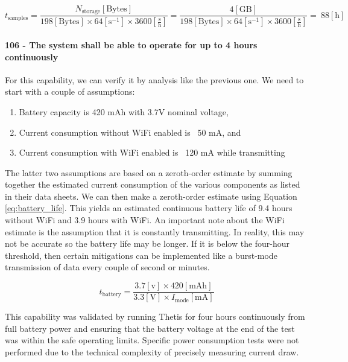\begin{equation} \label{eq:storage_time}
    t_{\text{samples}} = \frac{N_{\text{storage}} [\text{Bytes}]}{198 [\text{Bytes}] \times 64 [\text{s}^{-1}] \times 3600 \left[\frac{\text{s}}{\text{h}}\right]} = \frac{4 [\text{GB}]}{198 [\text{Bytes}] \times 64 [\text{s}^{-1}] \times 3600 \left[\frac{\text{s}}{\text{h}}\right]} = ~88 [\text{h}]
\end{equation}

\paragraph*{106 - The system shall be able to operate for up to 4 hours continuously} For this capability, we can verify it by analysis like the previous one.
We need to start with a couple of assumptions:

\begin{enumerate}
    \item Battery capacity is 420 mAh with 3.7V nominal voltage,
    \item Current consumption without WiFi enabled is ~50 mA, and
    \item Current consumption with WiFi enabled is ~120 mA while transmitting
\end{enumerate}

The latter two assumptions are based on a zeroth-order estimate by summing together the estimated current consumption of the various components as listed in their data sheets.
We can then make a zeroth-order estimate using Equation \ref{eq:battery_life}.
This yields an estimated continuous battery life of 9.4 hours without WiFi and 3.9 hours with WiFi.
An important note about the WiFi estimate is the assumption that it is constantly transmitting.
In reality, this may not be accurate so the battery life may be longer.
If it is below the four-hour threshold, then certain mitigations can be implemented like a burst-mode transmission of data every couple of second or minutes.

\begin{equation} \label{eq:battery_life}
    t_{\text{battery}} = \frac{3.7 [\text{v}] \times 420 [\text{mAh}]}{3.3 [\text{V}] \times I_{\text{mode}} [\text{mA}]}
\end{equation}

This capability was validated by running Thetis for four hours continuously from full battery power and ensuring that the battery voltage at the end of the test was within the safe operating limits.
Specific power consumption tests were not performed due to the technical complexity of precisely measuring current draw.

